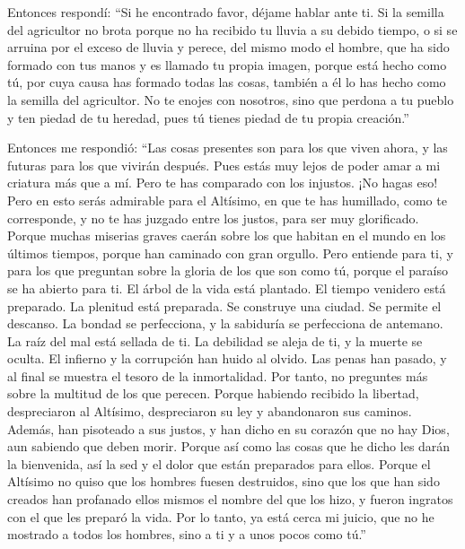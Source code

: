  Entonces respondí: ``Si he encontrado favor, déjame
hablar ante ti.  Si la semilla del agricultor no brota
porque no ha recibido tu lluvia a su debido tiempo, o si se arruina por
el exceso de lluvia y perece,  del mismo modo el hombre,
que ha sido formado con tus manos y es llamado tu propia imagen, porque
está hecho como tú, por cuya causa has formado todas las cosas, también
a él lo has hecho como la semilla del agricultor.  No te
enojes con nosotros, sino que perdona a tu pueblo y ten piedad de tu
heredad, pues tú tienes piedad de tu propia creación.''

 Entonces me respondió: ``Las cosas presentes son para
los que viven ahora, y las futuras para los que vivirán después.
 Pues estás muy lejos de poder amar a mi criatura más que
a mí. Pero te has comparado con los injustos. ¡No hagas eso!
 Pero en esto serás admirable para el Altísimo,
 en que te has humillado, como te corresponde, y no te
has juzgado entre los justos, para ser muy glorificado. 
Porque muchas miserias graves caerán sobre los que habitan en el mundo
en los últimos tiempos, porque han caminado con gran orgullo.
 Pero entiende para ti, y para los que preguntan sobre la
gloria de los que son como tú,  porque el paraíso se ha
abierto para ti. El árbol de la vida está plantado. El tiempo venidero
está preparado. La plenitud está preparada. Se construye una ciudad. Se
permite el descanso. La bondad se perfecciona, y la sabiduría se
perfecciona de antemano.  La raíz del mal está sellada de
ti. La debilidad se aleja de ti, y la muerte se oculta. El infierno y la
corrupción han huido al olvido.  Las penas han pasado, y
al final se muestra el tesoro de la inmortalidad.  Por
tanto, no preguntes más sobre la multitud de los que perecen.
 Porque habiendo recibido la libertad, despreciaron al
Altísimo, despreciaron su ley y abandonaron sus caminos. 
Además, han pisoteado a sus justos,  y han dicho en su
corazón que no hay Dios, aun sabiendo que deben morir. 
Porque así como las cosas que he dicho les darán la bienvenida, así la
sed y el dolor que están preparados para ellos. Porque el Altísimo no
quiso que los hombres fuesen destruidos,  sino que los
que han sido creados han profanado ellos mismos el nombre del que los
hizo, y fueron ingratos con el que les preparó la vida. 
Por lo tanto, ya está cerca mi juicio,  que no he
mostrado a todos los hombres, sino a ti y a unos pocos como tú.''

